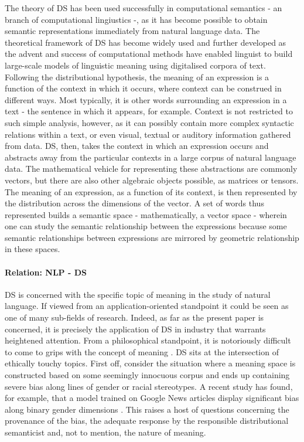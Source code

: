 \documentclass{article}
\begin{document}
The theory of DS has been used successfully in computational semantics - an branch of computational lingiustics -, as it has become possible to obtain semantic representations immediately from natural language data. The theoretical framework of DS has become widely used and further developed as the advent and success of computational methods have enabled linguist to build large-scale models of linguistic meaning using digitalised corpora of text. 
Following the distributional hypothesis, the meaning of an expression is a function of the context in which it occurs, where context can be construed in different ways. Most typically, it is other words surrounding an expression in a text - the sentence in which it appears, for example. Context is not restricted to such simple analysis, however, as it can possibly contain more complex syntactic relations within a text, or even visual, textual or auditory information gathered from data.
\cite{boleda2016formal}
DS, then, takes the context in which an expression occurs and abstracts away from the particular contexts in a large corpus of natural language data. The mathematical vehicle for representing these abstractions are commonly vectors, but there are also other algebraic objects possible, as matrices or tensors. The meaning of an expression, as a function of its context, is then represented by the distribution across the dimensions of the vector. A set of words thus represented builds a semantic space - mathematically, a vector space - wherein one can study the semantic relationship between the expressions because some semantic relationships between expressions are mirrored by geometric relationship in these spaces.

\paragraph{Relation: NLP - DS}
DS is concerned with the specific topic of meaning in the study of natural language. If viewed from an application-oriented standpoint it could be seen as one of many sub-fields of  research. Indeed, as far as the present paper is concerned, it is precisely the application of DS in industry that warrants heightened attention.
From a philosophical standpoint, it is notoriously difficult to come to grips with the concept of meaning .
DS sits at the intersection of ethically touchy topics. 
First off, consider the situation where a meaning space is constructed based on some seemingly innocuous corpus and ends up containing severe bias along lines of gender or racial stereotypes. A recent study has found, for example, that a model trained on Google News articles display significant bias along binary gender dimensions \cite{bolukbasi2016man}. This raises a host of questions concerning the provenance of the bias, the adequate response by the responsible distributional semanticist and, not to mention, the nature of meaning.
\end{document}

